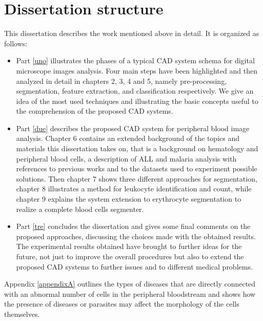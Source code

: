 \documentclass[final,a4paper,12pt,english]{UnicaPhdThesis3}
\begin{document}
\section{Dissertation structure} 
This dissertation describes the work mentioned above in detail. It is organized as follows:
\begin{itemize}
	\item Part \ref{uno} illustrates the phases of a typical CAD system schema for digital microscope images analysis. Four main steps have been highlighted and then analyzed in detail in chapters 2, 3, 4 and 5, namely pre-processing, segmentation, feature extraction, and classification respectively. We give an idea of the most used techniques and illustrating the basic concepts useful to the comprehension of the proposed CAD systems.
	
	\item Part \ref{due} describes the proposed CAD system for peripheral blood image analysis. Chapter 6 contains an extended background of the topics and materials this dissertation takes on, that is a background on hematology and peripheral blood cells, a description of ALL and malaria analysis with references to previous works and to the datasets used to experiment possible solutions. Then chapter 7 shows three different approaches for segmentation, chapter 8 illustrates a method for leukocyte identification and count, while chapter 9 explains the system extension to erythrocyte segmentation to realize a complete blood cells segmenter.
	
	\item Part \ref{tre} concludes the dissertation and gives some final comments on the proposed approaches, discussing the choices made with the obtained results. The experimental results obtained have brought to further ideas for the future, not just to improve the overall procedures but also to extend the proposed CAD systems to further issues and to different medical problems. 
\end{itemize}
Appendix \ref{appendixA} outlines the types of diseases that are directly connected with an abnormal number of cells in the peripheral bloodstream and shows how the presence of diseases or parasites may affect the morphology of the cells themselves.
\end{document}
